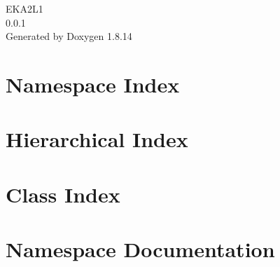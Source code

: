 \documentclass[twoside]{book}
\newcommand{\+}{\discretionary{\mbox{\scriptsize$\hookleftarrow$}}{}{}}
\newcommand{\clearemptydoublepage}{%
  \newpage{\pagestyle{empty}\cleardoublepage}%
}
\begin{document}
\hypersetup{pageanchor=false,
             bookmarksnumbered=true,
             pdfencoding=unicode
            }
\begin{titlepage}
\vspace*{7cm}
\begin{center}%
{\Large E\+K\+A2\+L1 \\[1ex]\large 0.\+0.\+1 }\\
\vspace*{1cm}
{\large Generated by Doxygen 1.8.14}\\
\end{center}
\end{titlepage}
\clearemptydoublepage
{}
\tableofcontents
\clearemptydoublepage
{}
\hypersetup{pageanchor=true}

\chapter{Namespace Index}

\chapter{Hierarchical Index}

\chapter{Class Index}

\chapter{Namespace Documentation}













\end{document}
